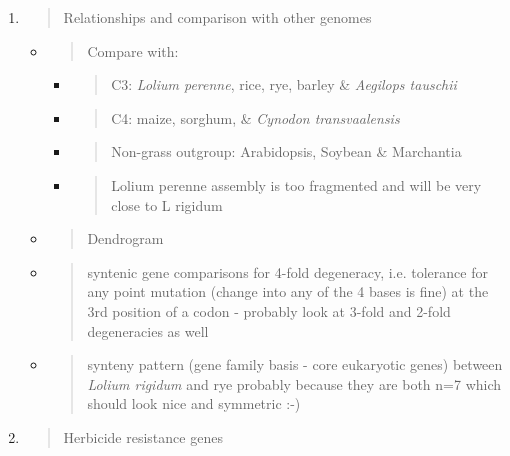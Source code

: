 \begin{enumerate}
\def\labelenumi{\arabic{enumi}.}
\setcounter{enumi}{1}
\item
  \begin{quote}
  Relationships and comparison with other genomes
  \end{quote}

  \begin{itemize}
  \item
    \begin{quote}
    Compare with:
    \end{quote}

    \begin{itemize}
    \item
      \begin{quote}
      C3: \emph{Lolium perenne}, rice, rye, barley \& \emph{Aegilops
      tauschii}
      \end{quote}
    \item
      \begin{quote}
      C4: maize, sorghum, \& \emph{Cynodon transvaalensis}
      \end{quote}
    \item
      \begin{quote}
      Non-grass outgroup: Arabidopsis, Soybean \& Marchantia
      \end{quote}
    \item
      \begin{quote}
      Lolium perenne assembly is too fragmented and will be very close
      to L rigidum
      \end{quote}
    \end{itemize}
  \item
    \begin{quote}
    Dendrogram
    \end{quote}
  \item
    \begin{quote}
    syntenic gene comparisons for 4-fold degeneracy, i.e. tolerance for
    any point mutation (change into any of the 4 bases is fine) at the
    3rd position of a codon - probably look at 3-fold and 2-fold
    degeneracies as well
    \end{quote}
  \item
    \begin{quote}
    synteny pattern (gene family basis - core eukaryotic genes) between
    \emph{Lolium rigidum} and rye probably because they are both n=7
    which should look nice and symmetric :-)
    \end{quote}
  \end{itemize}
\item
  \begin{quote}
  Herbicide resistance genes
  \end{quote}


\end{enumerate}
